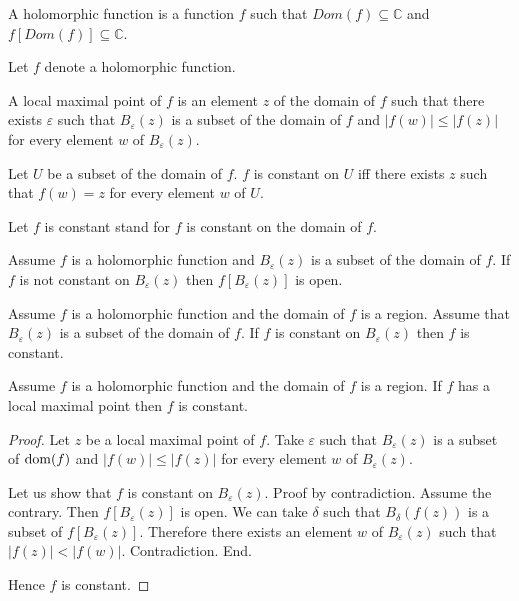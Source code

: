 \documentclass{article}
\newcommand{\Ball}[2]{B_{#1}(#2)}
\begin{document}
\begin{forthel}
    \begin{signature}
      A holomorphic function is a function $f$ such that $Dom(f) \subseteq \mathbb{C}$
and $f[Dom(f)] \subseteq \mathbb{C}$.
    \end{signature}

Let $f$ denote a holomorphic function.

    \begin{definition}
      A local maximal point of $f$ is an element $z$ of the domain of $f$ such that there exists 
$\varepsilon$ such that $\Ball{\varepsilon}{z}$ is a subset of the domain of $f$ and 
$|f(w)| \leq |f(z)|$ for every element $w$ of $\Ball{\varepsilon}{z}$.
    \end{definition}

    \begin{definition}
      Let $U$ be a subset of the domain of $f$. $f$ is constant on $U$ iff there exists 
$z$ such that $f(w) = z$ for every element $w$ of $U$.
    \end{definition}

    Let $f$ is constant stand for $f$ is constant on the domain of $f$.

    \begin{axiom}
      Assume $f$ is a holomorphic function and $\Ball{\varepsilon}{z}$ is a subset of the domain of $f$.
      If $f$ is not constant on $\Ball{\varepsilon}{z}$
        then $f[\Ball{\varepsilon}{z}]$ is open.
    \end{axiom}

    \begin{axiom}
      Assume $f$ is a holomorphic function and the domain of $f$ is a region.
      Assume that $\Ball{\varepsilon}{z}$ is a subset of the domain of $f$.
      If $f$ is constant on $\Ball{\varepsilon}{z}$ then $f$ is constant.
    \end{axiom}

    \begin{proposition}
      Assume $f$ is a holomorphic function and the domain of $f$ is a region.
      If $f$ has a local maximal point then $f$ is constant.
    \end{proposition}
    \begin{proof}
      Let $z$ be a local maximal point of $f$.
      Take $\varepsilon$ such that
        $\Ball{\varepsilon}{z}$ is a subset of $\operatorname{dom}(f)$
        and $|f(w)| \leq |f(z)|$ for every element $w$ of $\Ball{\varepsilon}{z}$.

      Let us show that $f$ is constant on $\Ball{\varepsilon}{z}$.
      Proof by contradiction.
        Assume the contrary.
        Then $f[\Ball{\varepsilon}{z}]$ is open.
        We can take $\delta$ such that
          $\Ball{\delta}{f(z)}$ is a subset of $f[\Ball{\varepsilon}{z}]$.
        Therefore there exists an element $w$ of $\Ball{\varepsilon}{z}$ such that
          $|f(z)| < |f(w)|$. Contradiction.
    	End.

      Hence $f$ is constant.
    \end{proof}
  \end{forthel}
\end{document}
